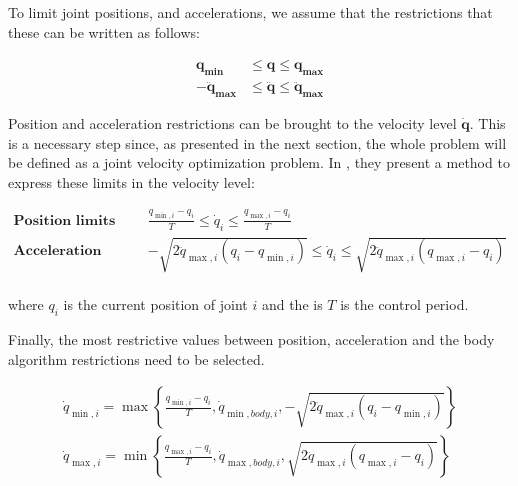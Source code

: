 To limit joint positions, and accelerations, we assume that the restrictions that these can be written as follows:

$$
\begin{aligned}
    \mathbf{q_{\min}} & \leq \mathbf{q} \leq \mathbf{q_{\max}} \\
    -\mathbf{\ddot{q}_{\max}} & \leq \mathbf{\ddot{q}} \leq \mathbf{\ddot{q}_{\max}}
\end{aligned}
$$

Position and acceleration restrictions can be brought to the velocity level $\dot{\mathbf{q}}$. This is a necessary step since, as presented in the next section,  the whole problem will be defined as a joint velocity optimization problem. In \cite{flacco2012motion}, they present a method to express these limits in the velocity level:

\begin{equation}
    \label{eq:jerkylimit}
    \begin{array}{ll}
        \textbf{Position limits} &
        \frac{q_{\min , i}-q_{i}}{T}
        \leq
        \dot{q}_i
        \leq
        \frac{q_{\max , i}-q_{i}}{T}
        \\
        \textbf{Acceleration limits} &
        -\sqrt{2 \ddot{q}_{\max , i}\left(q_{i}-q_{\min , i}\right)}
        \leq
        \dot{q}_i
        \leq
        \sqrt{2 \ddot{q}_{\max , i}\left(q_{\max , i}-q_{i}\right)}
        \\
    \end{array}
\end{equation}

where $q_{i}$ is the current position of joint $i$ and the is $T$ is the control period.

Finally, the most restrictive values between position, acceleration and the body algorithm restrictions need to be selected.

\begin{equation}
    \begin{array}{l}
        \dot{q}_{\min , i}=\max \left\{\frac{q_{\min , i}-q_{i}}{T},
        \dot{q}_{\min, body , i},
        -\sqrt{2 \ddot{q}_{\max , i}\left(q_{i}-q_{\min , i}\right)}\right\} \\
        \dot{q}_{\max , i}=\min \left\{\frac{q_{\max, i}-q_{i}}{T},
        \dot{q}_{\max, body , i},
        \sqrt{2 \ddot{q}_{\max , i}\left(q_{\max , i}-q_{i}\right)}\right\}
    \end{array}
\end{equation}



